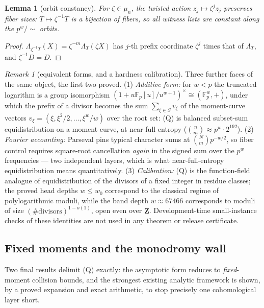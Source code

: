 \documentclass[11pt]{article}
\newtheorem{lemma}[lemma]{Lemma}
\theoremstyle{definition}
\theoremstyle{remark}
\newtheorem{remark}[remark]{Remark}
\newcommand{\F}{\mathbb{F}}
\begin{document}
\begin{lemma}[orbit constancy]\label{lem:capfp-orbit}
For $\zeta\in\mu_n$, the twisted action $z_j\mapsto\zeta^jz_j$ preserves fiber sizes: $T\mapsto\zeta^{-1}T$ is a bijection of fibers, so all witness lists are constant along the $p^w/\!\sim$ orbits.
\end{lemma}

\begin{proof}
$\Lambda_{\zeta^{-1}T}(X)=\zeta^{-m}\Lambda_T(\zeta X)$ has $j$-th prefix coordinate $\zeta^{j}$ times that of $\Lambda_T$, and $\zeta^{-1}D=D$.
\end{proof}

\begin{remark}[equivalent forms, and a hardness calibration]\label{rem:capfp-Q-forms}
Three further faces of the same object, the first two proved.  \textup{(1)}  \emph{Additive form:} for $w<p$ the truncated logarithm is a group isomorphism $(1+u\F_p[u]/u^{w+1})^\times\cong(\F_p^w,+)$, under which the prefix of a divisor becomes the sum $\sum_{\xi\in S}v_\xi$ of the moment-curve vectors $v_\xi=(\xi,\xi^2/2,\ldots,\xi^w/w)$ over the root set: \textup{(Q)} is balanced subset-sum equidistribution on a moment curve, at near-full entropy \textup($\binom nm\approx p^w\cdot2^{192}$\textup).  \textup{(2)}  \emph{Fourier accounting:} Parseval pins typical character sums at $\binom Nm p^{-w/2}$, so fiber control requires square-root cancellation \emph{again} in the signed sum over the $p^w$ frequencies --- two independent layers, which is what near-full-entropy equidistribution means quantitatively.  \textup{(3)}  \emph{Calibration:} \textup{(Q)} is the function-field analogue of equidistribution of the divisors of a fixed integer in residue classes; the proved head depths $w\le w_0$ correspond to the classical regime of polylogarithmic moduli, while the band depth $w\approx67466$ corresponds to moduli of size $(\#\text{divisors})^{1-o(1)}$, open even over $\mathbf Z$.  Development-time small-instance checks of these identities are not used in any theorem or release certificate.
\end{remark}

\subsection{Fixed moments and the monodromy wall}

Two final results delimit \textup{(Q)} exactly: the asymptotic form reduces to \emph{fixed}-moment collision bounds, and the strongest existing analytic framework is shown, by a proved expansion and exact arithmetic, to stop precisely one cohomological layer short.
\end{document}
